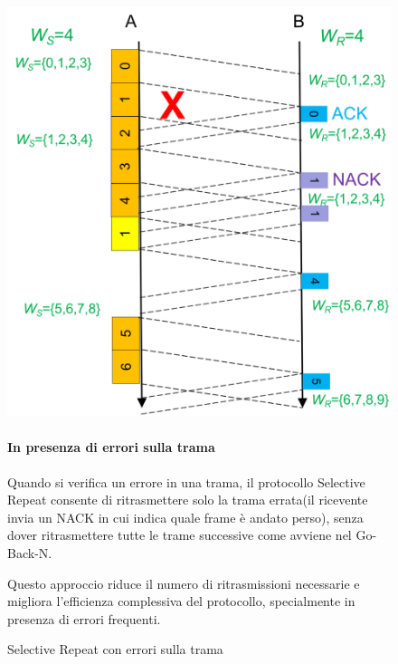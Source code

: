 \begin{figure}[htbp]
    \centering
    \begin{minipage}{0.47\textwidth}
        \includegraphics[width=\linewidth]{images/srerroritrama.png}
        \caption{Selective Repeat con errori sulla trama}
    \end{minipage}%
    \hfill
    \begin{minipage}{0.49\textwidth}
        \paragraph{In presenza di errori sulla trama}

        Quando si verifica un errore in una trama, il protocollo Selective Repeat consente di ritrasmettere solo la trama errata(il ricevente invia un NACK in cui indica quale frame è andato perso), senza dover ritrasmettere tutte le trame successive come avviene nel Go-Back-N. 
        

        Questo approccio riduce il numero di ritrasmissioni necessarie e migliora l'efficienza complessiva del protocollo, specialmente in presenza di errori frequenti.
    \end{minipage}
\end{figure}
\newpage
